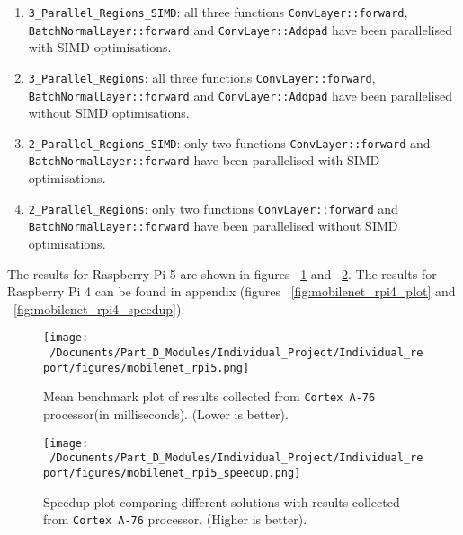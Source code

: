 \begin{enumerate}
	\item \texttt{3\_Parallel\_Regions\_SIMD}: all three functions \texttt{ConvLayer::forward}, \texttt{BatchNormalLayer::forward} and \texttt{ConvLayer::Addpad} have been parallelised with SIMD optimisations.
	\item \texttt{3\_Parallel\_Regions}: all three functions \texttt{ConvLayer::forward}, \texttt{BatchNormalLayer::forward} and \texttt{ConvLayer::Addpad} have been parallelised without SIMD optimisations.
	\item \texttt{2\_Parallel\_Regions\_SIMD}: only two functions \texttt{ConvLayer::forward} and \texttt{BatchNormalLayer::forward} have been parallelised with SIMD optimisations.
	\item \texttt{2\_Parallel\_Regions}: only two functions \texttt{ConvLayer::forward} and \texttt{BatchNormalLayer::forward} have been parallelised without SIMD optimisations.
\end{enumerate}

The results for Raspberry Pi 5 are shown in figures ~\ref{fig:mobilenet_rpi5_plot} and ~\ref{fig:mobilenet_rpi5_speedup}. The results for Raspberry Pi 4 can be found in appendix (figures ~\ref{fig:mobilenet_rpi4_plot} and ~\ref{fig:mobilenet_rpi4_speedup}). 

\begin{figure}[htbp] %
	\centering
	\texttt{[image: ~/Documents/Part\_D\_Modules/Individual\_Project/Individual\_report/figures/mobilenet\_rpi5.png]} %
	\caption{Mean benchmark plot of results collected from \texttt{Cortex A-76} processor(in milliseconds). (Lower is better).}
	\label{fig:mobilenet_rpi5_plot} %
\end{figure}

\begin{figure}[htbp] %
	\centering
	\texttt{[image: ~/Documents/Part\_D\_Modules/Individual\_Project/Individual\_report/figures/mobilenet\_rpi5\_speedup.png]} %
	\caption{Speedup plot comparing different solutions with results collected from \texttt{Cortex A-76} processor. (Higher is better).}
	\label{fig:mobilenet_rpi5_speedup} %
\end{figure}



